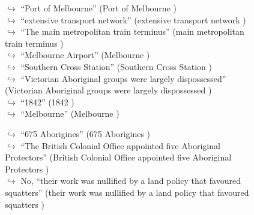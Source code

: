 \documentclass[11pt,a4paper, onecolumn]{article}
\begin{document}
\begin{figure}[t] \small \begin{tcolorbox}[boxsep=0pt,left=5pt,right=0pt,top=2pt,colback = yellow!5] \begin{dialogue}
 \small 
\colorbox{pink!25}{$\hookrightarrow$}
{ ``Port of Melbourne'' (Port of Melbourne ) }
\\
\colorbox{pink!25}{$\hookrightarrow$}
{ ``extensive transport network'' (extensive transport network ) }
\\
\colorbox{pink!25}{$\hookrightarrow$}
{ ``The main metropolitan train terminus'' (main metropolitan train terminus ) }
\\
\colorbox{pink!25}{$\hookrightarrow$}
{ ``Melbourne Airport'' (Melbourne ) }
\\
\colorbox{pink!25}{$\hookrightarrow$}
{ ``Southern Cross Station'' (Southern Cross Station ) }
\\
\colorbox{pink!25}{$\hookrightarrow$}
{ ``Victorian Aboriginal groups were largely dispossessed'' (Victorian Aboriginal groups were largely dispossessed ) }
\\
\colorbox{pink!25}{$\hookrightarrow$}
{ ``1842'' (1842 ) }
\\
\colorbox{pink!25}{$\hookrightarrow$}
{ ``Melbourne'' (Melbourne ) }
 \end{dialogue}\end{tcolorbox}\end{figure}\begin{figure}[t] \small \begin{tcolorbox}[boxsep=0pt,left=5pt,right=0pt,top=2pt,colback = yellow!5] \begin{dialogue}
 \small 
\colorbox{pink!25}{$\hookrightarrow$}
{ ``675 Aborigines'' (675 Aborigines ) }
\\
\colorbox{pink!25}{$\hookrightarrow$}
{ ``The British Colonial Office appointed five Aboriginal Protectors'' (British Colonial Office appointed five Aboriginal Protectors ) }
\\
\colorbox{pink!25}{$\hookrightarrow$}
\colorbox{red!25}{No,}
{ ``their work was nullified by a land policy that favoured squatters'' (their work was nullified by a land policy that favoured squatters ) }
\\
 \end{dialogue}\end{tcolorbox}\end{figure}
\end{document}
